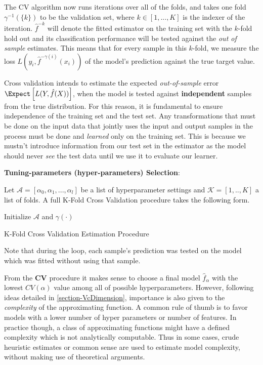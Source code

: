  The CV algorithm now runs iterations over all of the folds, and takes one fold $\gamma^{-1}(\{k\})$ to be the validation set, where $k \in [1,...,K]$ is the indexer of the iteration. $\hat{f}^{-k}$ will denote the fitted estimator on the training set with the $k$-fold hold out and its classification performance will be tested against the \textit{out of sample} estimates. This means that for every sample in this $k$-fold, we measure the loss $L(y_i, \hat{f}^{-\gamma(i)}(x_i))$ of the model's prediction against the true target value.
 
Cross validation intends to estimate the expected \textit{out-of-sample} error $\Expect \left[  L(Y, \hat{f}(X)) \right]$, when the model is tested against \textbf{independent} samples from the true distribution. For this reason, it is fundamental to ensure independence of the training set and the test set. Any transformations that must be done on the input data that jointly uses the input and output samples in the process must be done and \textit{learned} only on the training set. This is because we mustn't introduce information from our test set in the estimator as the model should never \textit{see} the test data until we use it to evaluate our learner. 

\textbf{Tuning-parameters (hyper-parameters) Selection}:

 Let $\mathcal{A} = [\alpha_0, \alpha_1,..., \alpha_l   ]$ be a list of hyperparameter settings and  $\mathcal{K} =[1,..,K]$ a list of folds.  A full K-Fold Cross Validation procedure takes the following form.
 
 \begin{algorithm}%
 	\SetAlgoLined
 	Initialize $\mathcal{A}$ and $\gamma(\cdot)$\;
 \caption{K-Fold Cross Validation Estimation Procedure}
\end{algorithm}

Note that during the loop, each sample's prediction was tested on the model which was fitted without using that sample. 

From the \textbf{CV} procedure it makes sense to choose a final  model $\hat{f}_\alpha$ with the lowest $CV(\alpha)$ value among all of possible hyperparameters. However, following ideas detailed in \ref{section-VcDimension}, importance is also given to the \textit{complexity} of the approximating function. A common rule of thumb is to favor models with a lower number of hyper parameters or number of features. In practice though, a class of approximating functions might have a defined complexity which is not analytically computable. Thus in some cases, crude heuristic estimates or common sense are used to estimate model complexity, without making use of theoretical arguments.
 
